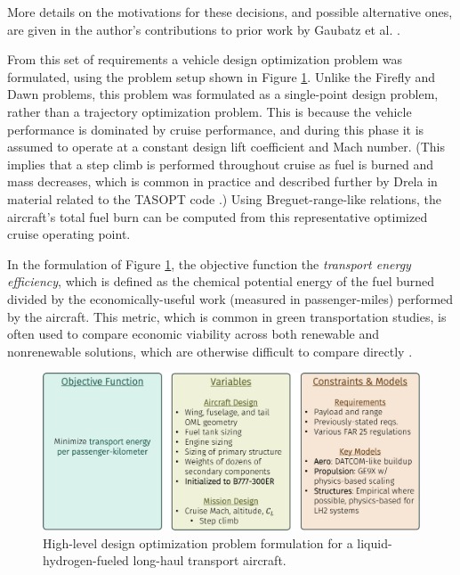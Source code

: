More details on the motivations for these decisions, and possible alternative ones, are given in the author's contributions to prior work by Gaubatz et al. \cite{gaubatz_estimating_2023}.

From this set of requirements a vehicle design optimization problem was formulated, using the problem setup shown in Figure \ref{fig:h2_formulation}. Unlike the Firefly and Dawn problems, this problem was formulated as a single-point design problem, rather than a trajectory optimization problem. This is because the vehicle performance is dominated by cruise performance, and during this phase it is assumed to operate at a constant design lift coefficient and Mach number. (This implies that a step climb is performed throughout cruise as fuel is burned and mass decreases, which is common in practice and described further by Drela in material related to the TASOPT code \cite{drela_tasopt_2010}.) Using Breguet-range-like relations, the aircraft's total fuel burn can be computed from this representative optimized cruise operating point.

In the formulation of Figure \ref{fig:h2_formulation}, the objective function the \emph{transport energy efficiency}, which is defined as the chemical potential energy of the fuel burned divided by the economically-useful work (measured in passenger-miles) performed by the aircraft. This metric, which is common in green transportation studies, is often used to compare economic viability across both renewable and nonrenewable solutions, which are otherwise difficult to compare directly \cite{waypoint2050}.

\begin{figure}[h]
    \centering
    \includegraphics[width=\textwidth,page=1]{../figures/Hydrogen_figures-crop.pdf}
    \caption{High-level design optimization problem formulation for a liquid-hydrogen-fueled long-haul transport aircraft.}
    \label{fig:h2_formulation}
\end{figure}

